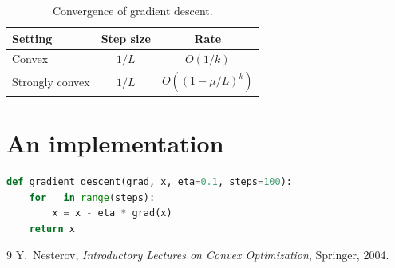 \documentclass[11pt]{article}
\begin{document}
\begin{table}[h]
  \centering
  \begin{tabular}{lcc}
    \hline
    Setting         & Step size  & Rate              \\
    \hline
    Convex          & $1/L$      & $O(1/k)$          \\
    Strongly convex & $1/L$      & $O((1-\mu/L)^k)$  \\
    \hline
  \end{tabular}
  \caption{Convergence of gradient descent.}
  \label{tab:rates}
\end{table}

\section{An implementation}

\begin{lstlisting}[language=Python]
def gradient_descent(grad, x, eta=0.1, steps=100):
    for _ in range(steps):
        x = x - eta * grad(x)
    return x
\end{lstlisting}


\begin{thebibliography}{9}
    Y.~Nesterov, \textit{Introductory Lectures on Convex Optimization},
    Springer, 2004.
\end{thebibliography}
\end{document}
